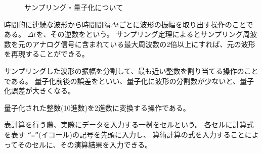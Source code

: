 \begin{figure}[htb]
  \begin{center}
  \caption{サンプリング・量子化について}
  \label{im2}
  \end{center}
\end{figure}

\begin{description}
  \setlength{\parskip}{0cm} %
  \setlength{\itemsep}{0cm} %
  \item[サンプリング] 時間的に連続な波形から時間間隔$\varDelta t$ごとに波形の振幅を取り出す操作のことである。
  $\varDelta t$を\textbf{}、その逆数を\textbf{}という。
  サンプリング定理によるとサンプリング周波数を元のアナログ信号に含まれている最大周波数の2倍以上にすれば、元の波形を再現することができる。
  \item[量子化] サンプリングした波形の振幅を分割して、最も近い整数を割り当てる操作のことである。
  量子化前後の誤差を\textbf{}といい、量子化に波形の分割数が少ないと、量子化誤差が大きくなる。
  \item[符号化] 量子化された整数(10進数)を2進数に変換する操作である。
\end{description}

表計算を行う際、実際にデータを入力する一桝をセルという。
各セルに計算式を表す \verb|“=”|(イコール)の記号を先頭に入力し、
算術計算の式を入力することによってそのセルに、その演算結果を入力できる。

